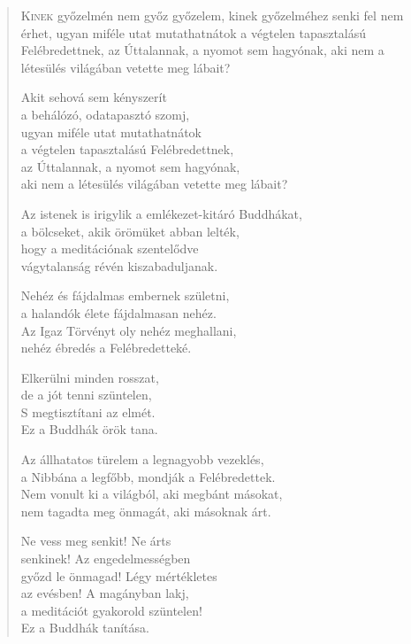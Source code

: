 
\begin{verse}

{\par%
\lettrine[slope=0.5em]{K}{inek} {\LettrineTextFont győzelmén nem győz győzelem,}\newline
kinek győzelméhez senki fel nem érhet,\newline
ugyan miféle utat mutathatnátok\verselinebreak
a végtelen tapasztalású Felébredettnek,\verselinebreak
az Úttalannak, a nyomot sem hagyónak,\verselinebreak
aki nem a létesülés világában vetette meg lábait?
\par}

 Akit sehová sem kényszerít\\
a behálózó, odatapasztó szomj,\\
ugyan miféle utat mutathatnátok\\
a végtelen tapasztalású Felébredettnek,\\
az Úttalannak, a nyomot sem hagyónak,\\
aki nem a létesülés világában vetette meg lábait?

 Az istenek is irigylik a emlékezet-kitáró Buddhákat,\\
a bölcseket, akik örömüket abban lelték,\\
hogy a meditációnak szentelődve\\
vágytalanság révén kiszabaduljanak.

 Nehéz és fájdalmas embernek születni,\\
a halandók élete fájdalmasan nehéz.\\
Az Igaz Törvényt oly nehéz meghallani,\\
nehéz ébredés a Felébredetteké.

 Elkerülni minden rosszat,\\
de a jót tenni szüntelen,\\
S megtisztítani az elmét.\\
Ez a Buddhák örök tana.

 Az állhatatos türelem a legnagyobb vezeklés,\\
a Nibbána a legfőbb, mondják a Felébredettek.\\
Nem vonult ki a világból, aki megbánt másokat,\\
nem tagadta meg önmagát, aki másoknak árt.

 Ne vess meg senkit! Ne árts\\
senkinek! Az engedelmességben\\
győzd le önmagad! Légy mértékletes\\
az evésben! A magányban lakj,\\
a meditációt gyakorold szüntelen!\\
Ez a Buddhák tanítása.


\end{verse}
